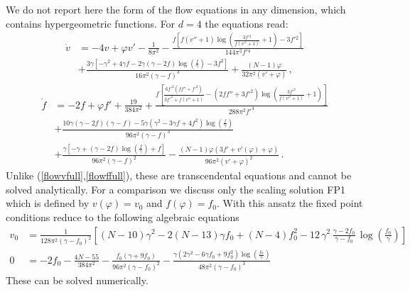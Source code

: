 \documentclass[11pt]{book} %
\begin{document}
We do not report here the form of the flow equations in any dimension,
which contains hypergeometric functions.
For $d=4$ the equations read:
\begin{align}
  \dot v &= - 4v + \varphi v' - \frac{1}{8\pi^2}
            - \frac{ f \left[ f (v''+1) \log\left( \frac{ 3 f'{}^2 }{ f (v''+1) } + 1 \right) - 3 f'{}^2 \right] }
                   { 144 \pi^2 f'{}^4 } \nonumber \\
  &         + \frac{ 3 \gamma \left[ - \gamma^2 + 4\gamma f - 2\gamma(\gamma-2f) \log \left( \frac{f}{\gamma} \right) - 3 f^2\right]}
                   { 16 \pi ^2 (\gamma -f)^3}+\frac{(N-1) \varphi }{32 \pi ^2 \left(v'+\varphi \right)} \,,
\end{align}
\begin{align}
  \dot f &= - 2f + \varphi f' + \frac{19}{384\pi^2}
            + \frac{ f \left[\frac{6f'^2\left(f f''+f'^2\right)}{3f'^2+f\left(v''+1\right)}
            - \left(2 f f''+3 f'^2\right)
              \log\left(\frac{3 f'^2}{f(v''+1)}+1\right)\right]}{288 \pi ^2 f'^4} \nonumber \\
  &         + \frac{ 10 \gamma  (\gamma -2 f) (\gamma -f)-5 \gamma  \left(\gamma ^2-3 \gamma  f+4 f^2\right) \log \left(\frac{f}{\gamma }\right)}
                   { 96 \pi ^2 (\gamma -f)^3} \nonumber \\
  &         + \frac{ \gamma\left[-\gamma +(\gamma-2f)\log\left(\frac{f}{\gamma}\right)+f\right]}
                   {96\pi^2(\gamma-f)^2}
            - \frac{(N-1) \varphi  \left(3 f'+v'(\varphi )+\varphi \right)}{96 \pi ^2 \left(v'+\varphi\right)^2} \,.
\end{align}
Unlike (\ref{flowvfull},\ref{flowffull}),
these are transcendental equations and cannot be solved analytically.
For a comparison we discuss
only the  scaling solution FP1
which is defined by $v(\varphi)=v_0$ and $f(\varphi)=f_0$.
With this ansatz the fixed point conditions reduce to
the following algebraic equations
\begin{align}
  \label{eqpureFP1}
  v_0 &= \frac{1}{128\pi^2(\gamma-f_0)^2}\left[ (N-10)\gamma^2-2(N-13)\gamma f_0+(N-4)f_0^2 - 12 \, \gamma^2 \, \frac{ \gamma - 2f_0 }{ \gamma - f_0} \, \log\left(\frac{f_0}{\gamma}\right) \right] \nonumber \\
  0   &= -2f_0-\frac{4N-55}{384\pi^2} -\frac{f_0(\gamma+9f_0)}{96\pi^2(\gamma-f_0)^2} -\frac{\gamma\left(2\gamma^2-6\gamma f_0+9f_0^2\right) \log\left(\frac{f_0}{\gamma}\right)}{48\pi^2(\gamma-f_0)^3}
\end{align}
These can be solved numerically.
\end{document}
